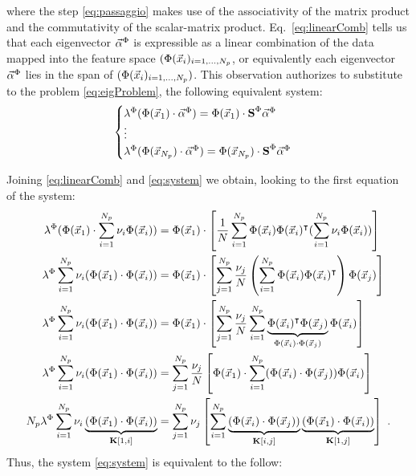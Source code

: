 where the step \eqref{eq:passaggio} makes use of the associativity of the matrix product and the commutativity of the scalar-matrix product. Eq.~\eqref{eq:linearComb} tells us that each eigenvector $\vec{\alpha}^\Phi$ is expressible as a linear combination of the data mapped into the feature space $(\Phi(\vec{x}_{i})_{i=1,\dots,N_p}$, or equivalently each eigenvector $\vec{\alpha}^\Phi$ lies in the span of $(\Phi(\vec{x}_{i})_{i=1,\dots,N_p})$. This observation authorizes to substitute to the problem \eqref{eq:eigProblem}, the following equivalent system:
\begin{equation}\label{eq:system}
\begin{cases}
\lambda^\Phi(\Phi(\vec{x}_{1})\cdot  \vec{\alpha}^\Phi) = \Phi(\vec{x}_{1})\cdot \textbf{S}^\Phi \vec{\alpha}^\Phi \\
\vdots\\
\lambda^\Phi(\Phi(\vec{x}_{N_p})\cdot  \vec{\alpha}^\Phi) = \Phi(\vec{x}_{N_p})\cdot \textbf{S}^\Phi \vec{\alpha}^\Phi
\end{cases}
\end{equation}


Joining \eqref{eq:linearComb} and \eqref{eq:system} we obtain, looking to the first equation of the system:
\begin{align}
\lambda^\Phi(\Phi(\vec{x}_{1})\cdot \sum_{i=1}^{N_p}\nu_i\Phi(\vec{x}_{i})) &= \Phi(\vec{x}_{1})\cdot\left[ \frac{1}{N}\sum_{i=1}^{N_p}\Phi(\vec{x}_{i})\Phi(\vec{x}_{i})^\intercal (\sum_{i=1}^{N_p}\nu_i \Phi(\vec{x}_{i}))\right]\\
\lambda^\Phi \sum_{i=1}^{N_p}\nu_i(\Phi(\vec{x}_{1})\cdot \Phi(\vec{x}_{i})) &=\Phi(\vec{x}_{1})\cdot\left[ \sum_{j=1}^{N_p}\frac{\nu_j}{N}\left(\sum_{i=1}^{N_p}\Phi(\vec{x}_{i})\Phi(\vec{x}_{i})^\intercal\right)  \Phi(\vec{x}_{j})\right]\\
\lambda^\Phi \sum_{i=1}^{N_p}\nu_i(\Phi(\vec{x}_{1})\cdot \Phi(\vec{x}_{i})) &=\Phi(\vec{x}_{1})\cdot\left[ \sum_{j=1}^{N_p}\frac{\nu_j}{N}\sum_{i=1}^{N_p}\underbrace{\Phi(\vec{x}_{i})^\intercal \Phi(\vec{x}_{j})}_{\Phi(\vec{x}_{i}) \cdot \Phi(\vec{x}_{j})}\Phi(\vec{x}_{i})\right]\\
\lambda^\Phi \sum_{i=1}^{N_p}\nu_i(\Phi(\vec{x}_{1})\cdot \Phi(\vec{x}_{i})) &= \sum_{j=1}^{N_p}\frac{\nu_j}{N}\left[\Phi(\vec{x}_{1})\cdot\sum_{i=1}^{N_p}(\Phi(\vec{x}_{i}) \cdot \Phi(\vec{x}_{j}))\Phi(\vec{x}_{i})\right]\\
N_p\lambda^\Phi \sum_{i=1}^{N_p}\nu_i\underbrace{(\Phi(\vec{x}_{1})\cdot \Phi(\vec{x}_{i}))}_{\textbf{K}[1,i]} &= \sum_{j=1}^{N_p}\nu_j\left[\sum_{i=1}^{N_p}\underbrace{(\Phi(\vec{x}_{i}) \cdot \Phi(\vec{x}_{j}))}_{\textbf{K}[i,j]}\underbrace{(\Phi(\vec{x}_{1})\cdot\Phi(\vec{x}_{i}))}_{\textbf{K}[1,j]}\right]\mbox{ .}
\end{align}
Thus, the system \eqref{eq:system} is equivalent to the follow:

